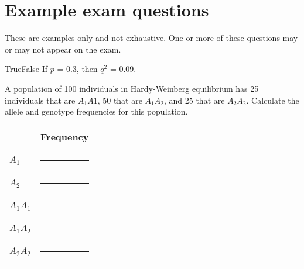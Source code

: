 \documentclass[letterpaper]{tufte-handout}
\begin{document}
\section*{Example exam questions}

These are examples only and not exhaustive. One or more of these questions may or may not appear on the exam.

\bigskip

\noindent True\hspace{1em}False\hspace{1em} If $p$ = 0.3, then $q^2$ = 0.09.

\bigskip \bigskip

\noindent A population of 100 individuals in Hardy-Weinberg equilibrium
has 25 individuals that are $A_1A1$, 50 that are $A_1A_2$, and 25 
that are $A_2A_2$. Calculate the allele and genotype frequencies 
for this population.

\bigskip

\begin{tabular}{@{}ll@{}}
	\toprule
	& Frequency\tabularnewline
	\midrule
	& \tabularnewline
	$A_1$		&	\rule{0.6in}{0.4pt}\tabularnewline[2em]
	$A_2$		&	\rule{0.6in}{0.4pt}\tabularnewline[2em]
	$A_1A_1$	&	\rule{0.6in}{0.4pt}\tabularnewline[2em]
	$A_1A_2$	&	\rule{0.6in}{0.4pt}\tabularnewline[2em]
	$A_2A_2$	&	\rule{0.6in}{0.4pt}\tabularnewline
	\bottomrule
\end{tabular}
\end{document}

